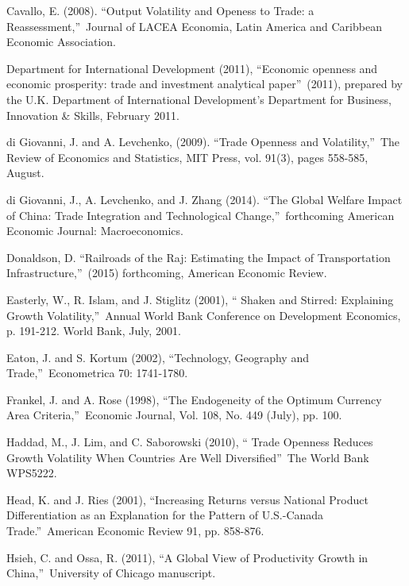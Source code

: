 \documentclass[12pt]{article}
\begin{document}
\begin{thebibliography}{99}
\bibitem{} Cavallo, E. (2008). \textquotedblleft Output Volatility and
Openess to Trade: a Reassessment,\textquotedblright\ Journal of LACEA
Economia, Latin America and Caribbean Economic Association.

\bibitem{} Department for International Development (2011),
\textquotedblleft Economic openness and economic prosperity: trade and
investment analytical paper\textquotedblright\ (2011), prepared by the U.K.
Department of International Development's Department for Business,
Innovation \& Skills, February 2011.

\bibitem{} di Giovanni, J. and A. Levchenko, (2009). \textquotedblleft Trade
Openness and Volatility,\textquotedblright\ The Review of Economics and
Statistics, MIT Press, vol. 91(3), pages 558-585, August.

\bibitem{} di Giovanni, J., A. Levchenko, and J. Zhang (2014).
\textquotedblleft The Global Welfare Impact of China: Trade Integration and
Technological Change,\textquotedblright\ forthcoming American Economic
Journal: Macroeconomics.

\bibitem{} Donaldson, D. \textquotedblleft Railroads of the Raj: Estimating
the Impact of Transportation Infrastructure,\textquotedblright\ (2015)
forthcoming, American Economic Review.

\bibitem{} Easterly, W., R. Islam, and J. Stiglitz (2001), \textquotedblleft
Shaken and Stirred: Explaining Growth Volatility,\textquotedblright\ Annual
World Bank Conference on Development Economics, p. 191-212. World Bank,
July, 2001.

\bibitem{} Eaton, J. and S. Kortum (2002), \textquotedblleft Technology,
Geography and Trade,\textquotedblright\ Econometrica 70: 1741-1780.

\bibitem{} Frankel, J. and A. Rose (1998), \textquotedblleft The Endogeneity
of the Optimum Currency Area Criteria,\textquotedblright\ Economic Journal,
Vol. 108, No. 449 (July), pp. 100.

\bibitem{} Haddad, M., J. Lim, and C. Saborowski (2010), \textquotedblleft
Trade Openness Reduces Growth Volatility When Countries Are Well
Diversified\textquotedblright\ The World Bank WPS5222.

\bibitem{} Head, K. and J. Ries (2001), \textquotedblleft Increasing Returns
versus National Product Differentiation as an Explanation for the Pattern of
U.S.-Canada Trade.\textquotedblright\ American Economic Review 91, pp.
858-876.

\bibitem{} Hsieh, C. and Ossa, R. (2011), \textquotedblleft A Global View of
Productivity Growth in China,\textquotedblright\ University of Chicago
manuscript.


\end{thebibliography}
\end{document}
